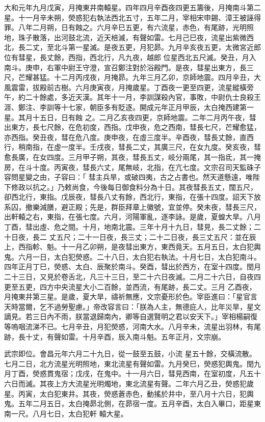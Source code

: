\begin{pinyinscope}
 大和元年九月戊寅，月掩東井南轅星。四年四月辛酉夜四更五籌後，月掩南斗第二星。十一月辛未朔，熒惑犯右執法西北五寸，五年二月，宰相宋申錫、漳王被誣得罪。八年二月朔，日有蝕之。六月辛巳五更，有六流星，赤色，有尾跡，光明照地，珠子散落，出河鼓北流，近天棓滅，有聲如雷。七月己巳夜，流星出紫微西北，長二丈，至北斗第一星滅。是夜五更，月犯昴。九月辛亥夜五更，太微宮近郎位有彗星，長丈餘，西指，西北行，凡九夜，越郎
 位星西北五尺滅。癸丑，月入南斗。庚申，右軍中尉王守澄，宣召鄭注對於浴殿門。是夜，彗星出東方，長三尺，芒耀甚猛。十二月丙戌夜，月掩昴。九年三月乙卯，京師地震。四月辛丑，大風震雷，拔殿前古樹。六月庚寅夜，月掩歲星。丁酉夜一更至四更，流星縱橫旁午，約二十餘處，多近天漢。其年十一月，李訓謀殺內官，事敗，中尉仇士良殺王涯、鄭注、李訓等十七家，朝臣多有貶逐。開成元年正月甲辰，太白掩西建第一星。其月十五日，日有蝕
 之。二月乙亥夜四更，京師地震。二年二月丙午夜，彗出東方，長七尺餘，在危初度，西指。戊申夜，危之西南，彗長七尺，芒耀愈猛，亦西指。癸丑夜，彗在危八度。庚申夜，在虛三度半。辛酉夜，彗長丈餘，直西行，稍南指，在虛一度半。壬戌夜，彗長二丈，其廣三尺，在女九度。癸亥夜，彗愈長廣，在女四度。三月甲子朔，其夜，彗長五丈，岐分兩尾，其一指氐，其一掩房，在斗十度。丙寅夜，彗長六丈，尾無岐，北指，在亢七度。文宗召司天監硃子容問星變之由，子容曰：「
 彗主兵旱，或破四夷，古之占書也。然天道懸遠，唯陛下修政以抗之。」乃敕尚食，今後每日御食料分為十日。其夜彗長五丈，闊五尺，卻西北行，東指。戊辰夜，彗長八丈有餘，西北行，東指，在張十四度。詔天下放系囚，撤樂減膳，避正殿；先是，群臣拜章上徽號，宜並停。癸未夜，彗長三尺，出軒轅之右，東指，在張七度。六月，河陽軍亂，逐李詠。是歲，夏蝗大旱。八月丁酉，彗出虛、危之間。十月，地南北震。三年十月十九日，彗見，長二丈餘；二十日夜，長二
 丈五尺；二十一日夜，長三丈；二十二日夜，長三丈五尺：並在辰上，西指軫、魁。十一月乙卯朔，是夜彗出東方，東西竟天。五月五日，太白犯輿鬼。六月一日，太白犯熒惑。二十八日，太白犯右執法。十月七日，太白犯南斗。四年正月丁巳，熒惑、太白、辰聚於南斗。癸酉，彗出於西方，在室十四度。閏月二十三日，又見於卷舌北，凡三十三日，至二十六日夜滅。二月二十六日，自夜四更至五更，四方中央流星大小二百餘，並西流，有尾跡，長二丈。三月
 乙酉夜，月掩東井第三星。是歲，夏大旱，禱祈無應，文宗憂形於色。宰臣進曰：「星官言天時當爾，乞不過勞聖慮。」帝改容言曰：「朕為人主，無德庇人，比年災旱，星文謫見。若三日內不雨，朕當退歸南內，卿等自選賢明之君以安天下。」宰相楊嗣復等嗚咽流涕不已。七月辛丑，月犯熒惑，河南大水。八月辛未，流星出羽林，有尾跡，長十丈，有聲如雷。十月辛酉，辰入南斗魁。五年正月，文宗崩。



 武宗即位。會昌元年六月二十九日，從一鼓至五鼓，小流
 星五十餘，交橫流散。七月二日，北方流星光明照地，東北流星有聲如雷。九月癸巳，熒惑犯輿鬼。閏九月丁酉，熒惑貫鬼宿；戊戌，在鬼中。十一月六日，彗見西南，在室初度，凡五十六日而滅。其夜上方大流星光明燭地，東北流星有聲。二年六月乙丑，熒惑犯歲星。丙寅，太白犯東井。其夜，熒惑蒼赤色，動搖於井中，至八月十六日，犯輿鬼。五年二月五日，太白掩昴北側，在昴宿一度。五月辛酉，太白入畢口，距星東南一尺。八月七日，太白犯軒
 轅大星。




\end{pinyinscope}
